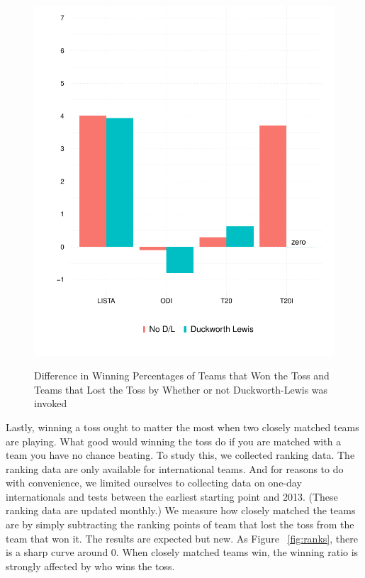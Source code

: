 \documentclass[12pt]{article}
\begin{document}
\begin{figure}[htbp]
\centering
\caption{Difference in Winning Percentages of Teams that Won the Toss and Teams that Lost the Toss by Whether or not Duckworth-Lewis was invoked}
\includegraphics[scale=.85]{../figs/winbyDL.pdf}
\label{fig:dl}
\end{figure}

Lastly, winning a toss ought to matter the most when two closely matched teams are playing. What good would winning the toss do if you are matched with a team you have no chance beating. To study this, we collected ranking data. The ranking data are only available for international teams. And for reasons to do with convenience, we limited ourselves to collecting data on one-day internationals and tests between the earliest starting point and 2013. (These ranking data are updated monthly.) We measure how closely matched the teams are by simply subtracting the ranking points of team that lost the toss from the team that won it. The results are expected but new. As Figure ~\ref{fig:ranks}, there is a sharp curve around 0. When closely matched teams win, the winning ratio is strongly affected by who wins the toss.
\end{document}
